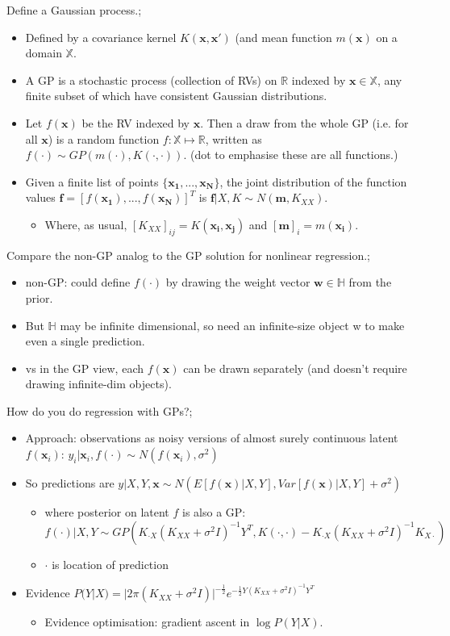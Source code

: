 \documentclass{article}
\begin{document}
Define a Gaussian process.; \begin{itemize} \item Defined by a covariance kernel $K(\mathbf{x, x'})$ (and mean function $m(\mathbf{x})$ on a domain $\mathbb{X}$.  \item A GP is a stochastic process (collection of RVs) on $\mathbb{R}$ indexed by $\mathbf{x}\in \mathbb{X}$, any finite subset of which have consistent Gaussian distributions.  \item Let $f(\mathbf{x})$ be the RV indexed by $\mathbf{x}$. Then a draw from the whole GP (i.e. for all $\mathbf{x}$) is a random function $f:\mathbb{X}\mapsto\mathbb{R}$, written as $f(\cdot)\sim GP(m(\cdot), K(\cdot, \cdot))$. (dot to emphasise these are all functions.) \item Given a finite list of points $\{\mathbf{x_1,...,x_N}\}$, the joint distribution of the function values $\mathbf{f}=[f(\mathbf{x_1}),...,f(\mathbf{x_N})]^T$ is $\mathbf{f}|X, K\sim N(\mathbf{m}, K_{XX})$.  \begin{itemize} \item Where, as usual, $[K_{XX}]_{ij}=K(\mathbf{x_i, x_j})$ and $[\mathbf{m}]_i=m(\mathbf{x_i})$.  \end{itemize} \end{itemize}

Compare the non-GP analog to the GP solution for nonlinear regression.; \begin{itemize} \item non-GP: could define $f(\cdot)$ by drawing the weight vector $\mathbf{w}\in \mathbb{H}$ from the prior.  \item But $\mathbb{H}$ may be infinite dimensional, so need an infinite-size object w to make even a single prediction.  \item vs in the GP view, each $f(\mathbf{x})$ can be drawn separately (and doesn't require drawing infinite-dim objects).  \end{itemize}

How do you do regression with GPs?; \begin{itemize} \item Approach: observations as noisy versions of almost surely continuous latent $f(\mathbf{x}_i)$: $y_i|\mathbf{x}_i, f(\cdot)\sim N(f(\mathbf{x}_i), \sigma^2)$ \item So predictions are $y|X, Y, \mathbf{x}\sim N(E[f(\mathbf{x})|X, Y], Var[f(\mathbf{x})|X, Y]+\sigma^2)$ \begin{itemize} \item where posterior on latent $f$ is also a GP: $f(\cdot)|X,Y\sim GP(K_{\cdot X}(K_{XX}+\sigma^2I)^{-1}Y^T, K(\cdot, \cdot)-K_{\cdot X}(K_{XX}+\sigma^2I)^{-1}K_{X\cdot})$ \item $\cdot$ is location of prediction \end{itemize} \item Evidence $P(Y|X)=|2\pi(K_{XX}+\sigma^2I)|^{-\frac{1}{2}}e^{-\frac{1}{2}Y(K_{XX}+\sigma^2I)^{-1}Y^T}$ \begin{itemize} \item Evidence optimisation: gradient ascent in $\log P(Y|X)$.  \end{itemize} \end{itemize}
\end{document}
